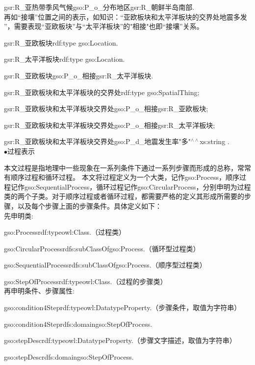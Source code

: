 gsr:R\_亚热带季风气候\quad gso:P\_o\_分布地区\quad gsr:R\_朝鲜半岛南部\quad .
\\
再如“接壤”位置之间的表示，如知识：“亚欧板块和太平洋板块的交界处地震多发
”，需要表现“亚欧板块”与“太平洋板块”的"相接"也即“接壤”关系。

gsr:R\_亚欧板块\quad rdf:type \quad gso:Location\quad .

gsr:R\_太平洋板块\quad rdf:type \quad gso:Location\quad .

gsr:R\_亚欧板块\quad gso:P\_o\_相接\quad gsr:R\_太平洋板块\quad .

gsr:R\_亚欧板块和太平洋板块的交界处\quad rdf:type \quad gso:SpatialThing\quad ;\quad 

gsr:R\_亚欧板块和太平洋板块交界处\quad gso:P\_o\_相接\quad gsr:R\_亚欧板块\quad ;

gsr:R\_亚欧板块和太平洋板块交界处\quad gso:P\_o\_相接\quad gsr:R\_太平洋板块\quad ;

gsr:R\_亚欧板块和太平洋板块交界处\quad gso:P\_d\_地震发生率\quad "多"$^{\land\land}$xs:string .
\\

$\bullet$过程表示

本文过程是指地理中一些现象在一系列条件下通过一系列步骤而形成的总称，常常有顺序过程和循环过程。 本文将过程定义为一个大类，记作gso:Process，顺序过程记作gso:SequentialProcess，循环过程记作gso:CircularProcess，分别申明为过程类的两个子类。对于顺序过程或者循环过程，都需要严格的定义其形成所需要的步骤，以及每个步骤上面的步骤条件。具体定义如下：\\
先申明类:

gso:Process\quad rdf:type\quad owl:Class\quad .\quad （过程类）

gso:CircularProcess\quad rdfs:subClassOf\quad gso:Process\quad .（循环型过程类）

gso:SequentialProcess\quad rdfs:subClassOf\quad gso:Process\quad .\quad （顺序型过程类）

gso:StepOfProcess\quad rdf:type\quad owl:Class\quad .（过程的步骤类）
\\
再申明条件、步骤属性:

gso:condition4Step\quad rdf:type\quad owl:DatatypeProperty\quad .\quad （步骤条件，取值为字符串）

gso:condition4Step\quad rdfs:domain\quad gso:StepOfProcess\quad .

gso:stepDesc\quad rdf:type\quad owl:DatatypeProperty\quad .\quad （步骤文字描述，取值为字符串）

gso:stepDesc\quad rdfs:domain\quad gso:StepOfProcess\quad .


